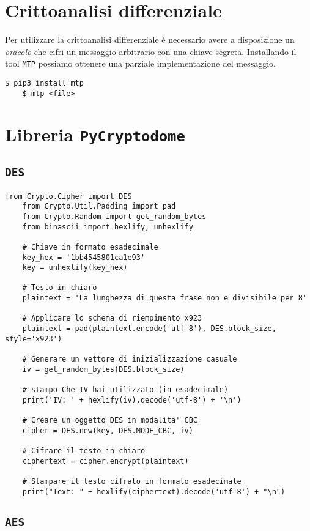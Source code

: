 \section{Crittoanalisi differenziale}
Per utilizzare la crittoanalisi differenziale è necessario avere a disposizione
un \textit{oracolo} che cifri un messaggio arbitrario con una chiave segreta.
Installando il tool \texttt{MTP} possiamo ottenere una parziale implementazione
del messaggio.

\begin{lstlisting}[style=bashStyle]
    $ pip3 install mtp
    $ mtp <file>
\end{lstlisting}
\section{Libreria \texttt{PyCryptodome}}
\subsection{\texttt{DES}}
\begin{lstlisting}[style=pythonStyle]
    from Crypto.Cipher import DES
    from Crypto.Util.Padding import pad
    from Crypto.Random import get_random_bytes
    from binascii import hexlify, unhexlify

    # Chiave in formato esadecimale
    key_hex = '1bb4545801ca1e93'
    key = unhexlify(key_hex)

    # Testo in chiaro
    plaintext = 'La lunghezza di questa frase non e divisibile per 8'

    # Applicare lo schema di riempimento x923
    plaintext = pad(plaintext.encode('utf-8'), DES.block_size, style='x923')

    # Generare un vettore di inizializzazione casuale
    iv = get_random_bytes(DES.block_size)

    # stampo Che IV hai utilizzato (in esadecimale)
    print('IV: ' + hexlify(iv).decode('utf-8') + '\n')

    # Creare un oggetto DES in modalita' CBC
    cipher = DES.new(key, DES.MODE_CBC, iv)

    # Cifrare il testo in chiaro
    ciphertext = cipher.encrypt(plaintext)

    # Stampare il testo cifrato in formato esadecimale
    print("Text: " + hexlify(ciphertext).decode('utf-8') + "\n")
\end{lstlisting}

\subsection{\texttt{AES}}

